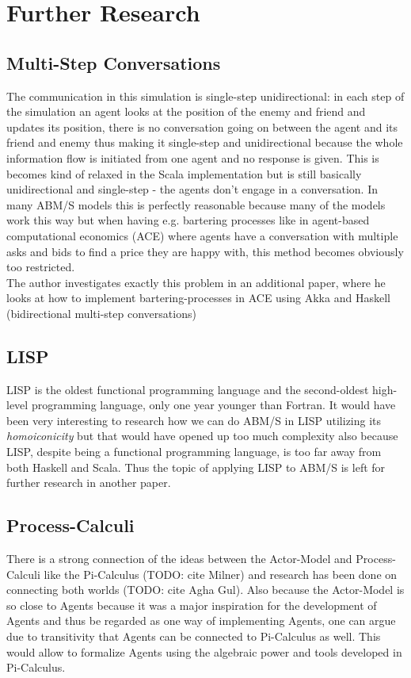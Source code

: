 \section{Further Research}

\subsection{Multi-Step Conversations}
The communication in this simulation is single-step unidirectional: in each step of the simulation an agent looks at the position of the enemy and friend and updates its position, there is no conversation going on between the agent and its friend and enemy thus making it single-step and unidirectional because the whole information flow is initiated from one agent and no response is given. This is becomes kind of relaxed in the Scala implementation but is still basically unidirectional and single-step - the agents don't engage in a conversation. In many ABM/S models this is perfectly reasonable because many of the models work this way but when having e.g. bartering processes like in agent-based computational economics (ACE) where agents have a conversation with multiple asks and bids to find a price they are happy with, this method becomes obviously too restricted. \\ The author investigates exactly this problem in an additional paper, where he looks at how to implement bartering-processes in ACE using Akka and Haskell (bidirectional multi-step conversations)

\subsection{LISP}
LISP is the oldest functional programming language and the second-oldest high-level programming language, only one year younger than Fortran. It would have been very interesting to research how we can do ABM/S in LISP utilizing its \textit{homoiconicity} but that would have opened up too much complexity also because LISP, despite being a functional programming language, is too far away from both Haskell and Scala. Thus the topic of applying LISP to ABM/S is left for further research in another paper. 

\subsection{Process-Calculi}
There is a strong connection of the ideas between the Actor-Model and Process-Calculi like the Pi-Calculus (TODO: cite Milner) and research has been done on connecting both worlds (TODO: cite Agha Gul). Also because the Actor-Model is so close to Agents because it was a major inspiration for the development of Agents and thus be regarded as one way of implementing Agents, one can argue due to transitivity that Agents can be connected to Pi-Calculus as well. This would allow to formalize Agents using the algebraic power and tools developed in Pi-Calculus.